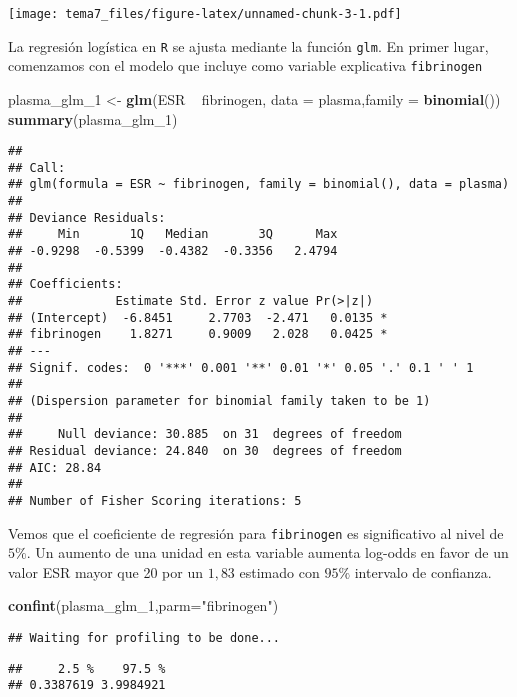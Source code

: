 \documentclass[]{article}
\newenvironment{Shaded}{\begin{snugshade}}{\end{snugshade}}
\newcommand{\KeywordTok}[1]{\textcolor[rgb]{0.13,0.29,0.53}{\textbf{{#1}}}}
\newcommand{\DataTypeTok}[1]{\textcolor[rgb]{0.13,0.29,0.53}{{#1}}}
\newcommand{\StringTok}[1]{\textcolor[rgb]{0.31,0.60,0.02}{{#1}}}
\newcommand{\NormalTok}[1]{{#1}}
\numberwithin{equation}{section}
\begin{document}
\texttt{[image: tema7\_files/figure-latex/unnamed-chunk-3-1.pdf]}

La regresión logística en \texttt{R} se ajusta mediante la función
\texttt{glm}. En primer lugar, comenzamos con el modelo que incluye como
variable explicativa \texttt{fibrinogen}

\begin{Shaded}
\begin{Highlighting}[]
\NormalTok{plasma_glm_1 <-}\StringTok{ }\KeywordTok{glm}\NormalTok{(ESR ~}\StringTok{ }\NormalTok{fibrinogen, }\DataTypeTok{data =} \NormalTok{plasma,}\DataTypeTok{family =} \KeywordTok{binomial}\NormalTok{())}
\KeywordTok{summary}\NormalTok{(plasma_glm_1)}
\end{Highlighting}
\end{Shaded}

\begin{verbatim}
## 
## Call:
## glm(formula = ESR ~ fibrinogen, family = binomial(), data = plasma)
## 
## Deviance Residuals: 
##     Min       1Q   Median       3Q      Max  
## -0.9298  -0.5399  -0.4382  -0.3356   2.4794  
## 
## Coefficients:
##             Estimate Std. Error z value Pr(>|z|)  
## (Intercept)  -6.8451     2.7703  -2.471   0.0135 *
## fibrinogen    1.8271     0.9009   2.028   0.0425 *
## ---
## Signif. codes:  0 '***' 0.001 '**' 0.01 '*' 0.05 '.' 0.1 ' ' 1
## 
## (Dispersion parameter for binomial family taken to be 1)
## 
##     Null deviance: 30.885  on 31  degrees of freedom
## Residual deviance: 24.840  on 30  degrees of freedom
## AIC: 28.84
## 
## Number of Fisher Scoring iterations: 5
\end{verbatim}

Vemos que el coeficiente de regresión para \texttt{fibrinogen} es
significativo al nivel de \(5\%\). Un aumento de una unidad en esta
variable aumenta log-odds en favor de un valor ESR mayor que 20 por un
\(1,83\) estimado con \(95\%\) intervalo de confianza.

\begin{Shaded}
\begin{Highlighting}[]
\KeywordTok{confint}\NormalTok{(plasma_glm_1,}\DataTypeTok{parm=}\StringTok{"fibrinogen"}\NormalTok{)}
\end{Highlighting}
\end{Shaded}

\begin{verbatim}
## Waiting for profiling to be done...
\end{verbatim}

\begin{verbatim}
##     2.5 %    97.5 % 
## 0.3387619 3.9984921
\end{verbatim}
\end{document}
